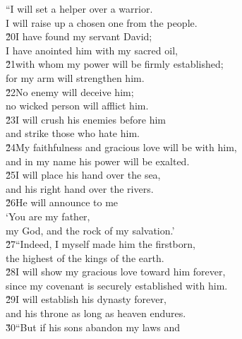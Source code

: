 \begin{poetry}
\poeml ``I will set a helper over a warrior. \\
\poemll    I will raise up a chosen one from the people. \\
\poeml \v{20}I have found my servant David; \\
\poemll    I have anointed him with my sacred oil, \\
\poeml \v{21}with whom my power will be firmly established; \\
\poemll    for my arm will strengthen him. \\
\poeml \v{22}No enemy will deceive him; \\
\poemll    no wicked person will afflict him. \\
\poemll    \v{23}I will crush his enemies before him \\
\poemll    and strike those who hate him. \\
\poemll    \v{24}My faithfulness and gracious love will be with him, \\
\poemll    and in my name his power will be exalted. \\
\poeml \v{25}I will place his hand over the sea, \\
\poemll    and his right hand over the rivers. \\
\poeml \v{26}He will announce to me \\
\poemll    `You are my father, \\
\poemlll       my God, and the rock of my salvation.' \\
\poeml \v{27}``Indeed, I myself made him the firstborn, \\
\poemll    the highest of the kings of the earth. \\
\poeml \v{28}I will show my gracious love toward him forever, \\
\poemll    since my covenant is securely established with him. \\
\poeml \v{29}I will establish his dynasty forever, \\
\poemll    and his throne as long as heaven endures. \\
\poeml \v{30}``But if his sons abandon my laws and \\

\end{poetry}
